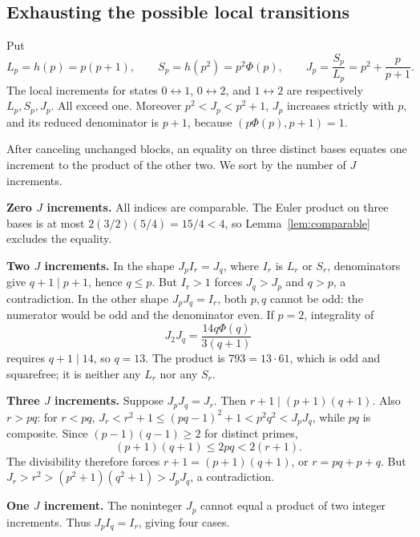 \documentclass[11pt,a4paper]{article}
\theoremstyle{remark}
\begin{document}
\subsection{Exhausting the possible local transitions}
Put
\[
 L_p=h(p)=p(p+1),\qquad S_p=h(p^2)=p^2\Phi(p),\qquad
 J_p=\frac{S_p}{L_p}=p^2+\frac p{p+1}.
\]
The local increments for states $0\leftrightarrow1$, $0\leftrightarrow2$,
and $1\leftrightarrow2$ are respectively $L_p,S_p,J_p$. All exceed one.
Moreover $p^2<J_p<p^2+1$, $J_p$ increases strictly with $p$, and its
reduced denominator is $p+1$, because $(p\Phi(p),p+1)=1$.

After canceling unchanged blocks, an equality on three distinct bases
equates one increment to the product of the other two. We sort by the number
of $J$ increments.

\textbf{Zero $J$ increments.} All indices are comparable. The Euler
product on three bases is at most $2(3/2)(5/4)=15/4<4$, so
Lemma~\ref{lem:comparable} excludes the equality.

\textbf{Two $J$ increments.} In the shape $J_p I_r=J_q$, where $I_r$ is
$L_r$ or $S_r$, denominators give $q+1\mid p+1$, hence $q\le p$.
But $I_r>1$ forces $J_q>J_p$ and $q>p$, a contradiction.
In the other shape $J_pJ_q=I_r$, both $p,q$ cannot be odd: the numerator
would be odd and the denominator even. If $p=2$, integrality of
\[
 J_2J_q=\frac{14q\Phi(q)}{3(q+1)}
\]
requires $q+1\mid14$, so $q=13$. The product is $793=13\cdot61$,
which is odd and squarefree; it is neither any $L_r$ nor any $S_r$.

\textbf{Three $J$ increments.} Suppose $J_pJ_q=J_r$.
Then $r+1\mid(p+1)(q+1)$. Also $r>pq$: for $r<pq$,
$J_r<r^2+1\le(pq-1)^2+1<p^2q^2<J_pJ_q$, while $pq$ is composite.
Since $(p-1)(q-1)\ge2$ for distinct primes,
\[
 (p+1)(q+1)\le2pq<2(r+1).
\]
The divisibility therefore forces $r+1=(p+1)(q+1)$, or $r=pq+p+q$.
But $J_r>r^2>(p^2+1)(q^2+1)>J_pJ_q$, a contradiction.

\textbf{One $J$ increment.} The noninteger $J_p$ cannot equal a product
of two integer increments. Thus $J_pI_q=I_r$, giving four cases.
\end{document}

